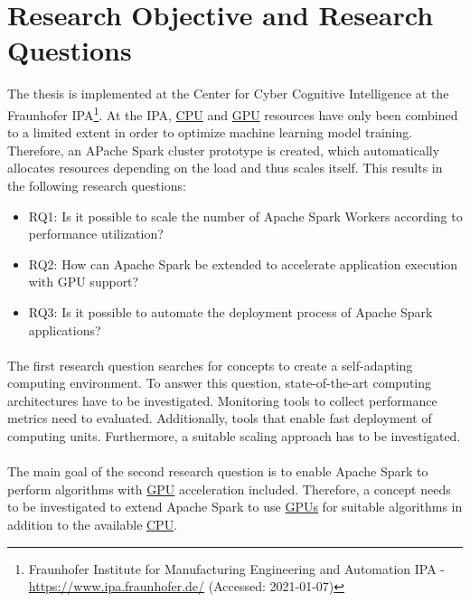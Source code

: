 \section{Research Objective and Research Questions}
The thesis is implemented at the Center for Cyber Cognitive Intelligence at the Fraunhofer IPA\footnote{Fraunhofer Institute for Manufacturing Engineering and Automation IPA - \url{https://www.ipa.fraunhofer.de/} (Accessed: 2021-01-07)}.
At the IPA, \hyperlink{abbr:cpu}{CPU} and \hyperlink{abbr:gpu}{GPU} resources have only been combined to a limited extent in order to optimize machine learning model training.
Therefore, an APache Spark cluster prototype is created, which automatically allocates resources depending on the load and thus scales itself.
This results in the following research questions:
\begin{itemize}
\item RQ1: Is it possible to scale the number of Apache Spark Workers according to performance utilization?
\item RQ2: How can Apache Spark be extended to accelerate application execution with GPU support?
\item RQ3: Is it possible to automate the deployment process of Apache Spark applications?
\end{itemize}


\paragraph{}
The first research question searches for concepts to create a self-adapting computing environment.
To answer this question, state-of-the-art computing architectures have to be investigated.
Monitoring tools to collect performance metrics need to evaluated. Additionally, tools that enable fast deployment of computing units.
Furthermore, a suitable scaling approach has to be investigated.


\paragraph{}
The main goal of the second research question is to enable Apache Spark to perform algorithms with \hyperlink{abbr:gpu}{GPU} acceleration included.
Therefore, a concept needs to be investigated to extend Apache Spark to use \hyperlink{abbr:gpu}{GPUs} for suitable algorithms in addition to the available \hyperlink{abbr:cpu}{CPU}.


